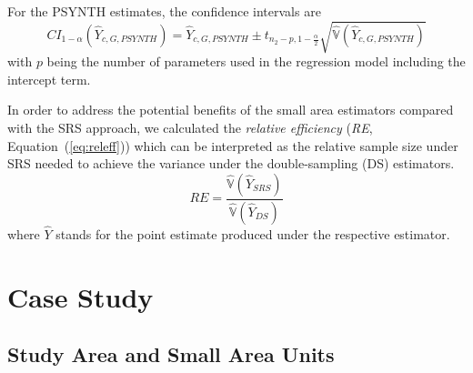 \documentclass[remotesensing,article,accept,moreauthors,pdftex,10pt,a4paper]{Definitions/mdpi}
\newcommand{\psynth}{PSYNTH}
\newcommand{\var}{\mathbb{V}}
\begin{document}
For the \psynth{} estimates, the confidence intervals are
\begin{equation}\label{ci_2phase_psynth}
CI_{1-\alpha}(\hat{Y}_{c,G,PSYNTH}) = \hat{Y}_{c,G,PSYNTH} \pm t_{n_{2}-p, 1-\frac{\alpha}{2}}\sqrt{\hat{\var}(\hat{Y}_{c,G,PSYNTH})}
\end{equation}
with $p$ being the number of parameters used in the regression model including the intercept term.

In order to address the potential benefits of the small area estimators compared with the SRS approach, we calculated the \textit{relative efficiency} (\textit{RE}, Equation~(\ref{eq:releff})) which can be interpreted as the relative sample size under SRS needed to achieve the variance under the double-sampling (DS) estimators.
\begin{equation}\label{eq:releff}
RE = \frac{\hat{\var}(\hat{Y}_{SRS})}{\hat{\var}(\hat{Y}_{DS})}
\end{equation}
where $\hat{Y}$ stands for the point estimate produced under the respective estimator.

\section{Case Study}
\label{sec:CaseStudy}
\vspace{-6pt}


\subsection{Study Area and Small Area Units}
\label{sec:studyarea}
\end{document}
